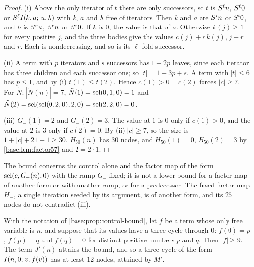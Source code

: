 \begin{proof}
(i) Above the only iterator of $t$ there are only successors, so $t$ is
$S^{\ell}n$, $S^{\ell}0$ or $S^{\ell}I(k,a;\,u.\,h)$ with $k$, $a$
and $h$ free of iterators.  Then $k$ and $a$ are $S^{i}n$ or $S^{i}0$,
and $h$ is $S^{r}u$, $S^{r}n$ or $S^{r}0$.  If $k$ is $0$, the
value is that of $a$.  Otherwise $k(j)\ge 1$ for every positive $j$, and the
three bodies give the values $a(j)+r\,k(j)$, $j+r$ and $r$.  Each is
nondecreasing, and so is its $\ell$-fold successor.

(ii) A term with $p$ iterators and $s$ successors has $1+2p$ leaves, since
each iterator has three children and each successor one; so
$|t|=1+3p+s$.  A term with $|t|\le 6$ has $p\le 1$, and by (i)
$t(1)\le t(2)$.  Hence $c(1)>0=c(2)$ forces $|c|\ge 7$.  For $\tilde N$:
$|\tilde N(n)|=7$, $\tilde N(1)=\operatorname{sel}(0,1,0)=1$ and
$\tilde N(2)=\operatorname{sel}(\operatorname{sel}(0,2,0),2,0)=\operatorname{sel}(2,2,0)=0$.

(iii) $G_-(1)=2$ and $G_-(2)=3$.  The value at $1$ is $0$ only if $c(1)>0$,
and the value at $2$ is $3$ only if $c(2)=0$.  By (ii) $|c|\ge 7$, so the
size is $1+|c|+21+1\ge 30$.  $H_{50}(n)$ has $30$ nodes, and
$H_{50}(1)=0$, $H_{50}(2)=3$ by \cref{base:lem:factor57} and $2=2\cdot 1$.
\end{proof}

The bound concerns the control alone and the factor map of the form
$\operatorname{sel}(c,G_-(n),0)$ with the ramp $G_-$ fixed; it is not a lower bound for a
factor map of another form or with another ramp, or for a predecessor.  The
fused factor map $H_-$, a single iteration seeded by its argument, is of
another form, and its $26$ nodes do not contradict (iii).

\begin{proposition}
\label{base:prop:clock-bound}
With the notation of \cref{base:prop:control-bound}, let $f$ be a term whose
only free variable is $n$, and suppose that its values have a three-cycle
through $0$: $f(0)=p$, $f(p)=q$ and $f(q)=0$ for distinct positive numbers
$p$ and $q$.  Then $|f|\ge 9$.  The term $J'(n)$ attains the bound, and so a
three-cycle of the form $I(n,0;\,v.\,f(v))$ has at least $12$ nodes,
attained by $M'$.
\end{proposition}

